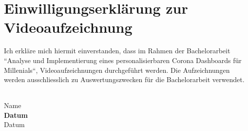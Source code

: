 \section{Einwilligungserklärung zur Videoaufzeichnung} \label{app:consens_screen_recording}
Ich erkläre mich hiermit einverstanden, dass im Rahmen der Bachelorarbeit ``Analyse und Implementierung eines personalisierbaren Corona Dashboards für Millenials``, Videoaufzeichnungen durchgeführt werden. Die Aufzeichnungen werden ausschliesslich zu Auswertungszwecken für die Bachelorarbeit verwendet.

\vspace{15mm}
\noindent
\makebox[60mm]{\hrulefill}\\
\textlangle{}Name\textrangle{} \\

\vspace{15mm}
\noindent
\textlangle{}\textbf{Datum}\textrangle{}\\
Datum\\